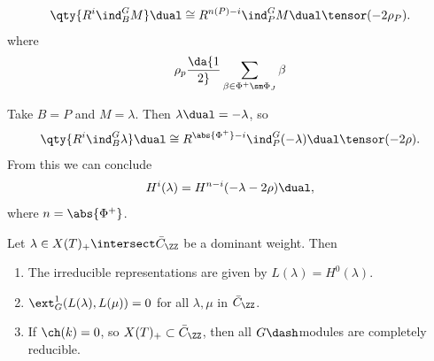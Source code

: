 \begin{theorem}

\begin{align*}  
\qty{ R^i \ind_B^G M }\dual \cong R^{n(P) -i} \ind_P^G M\dual \tensor (-2\rho_P)
.\end{align*} where
\begin{align*}
\rho_p \da {1\over 2}\sum_{\beta \in \Phi^+ \sm \Phi_J} \beta
\end{align*}

\end{theorem}

\begin{example}

Take \(B = P\) and \(M = \lambda\). Then \(\lambda \dual = -\lambda\),
so
\begin{align*}  
\qty{ R^i \ind_B^G \lambda }\dual \cong R^{\abs{\Phi^+} -i} \ind_P^G (- \lambda) \dual \tensor (-2\rho)
.\end{align*} From this we can conclude
\begin{align*}  
H^i(\lambda) = H^{n-i} (-\lambda - 2\rho)\dual
,\end{align*} where \(n = \abs{\Phi^+}\).

\end{example}

\begin{corollary}[?]

Let \(\lambda \in X(T)_+ \intersect \bar{C}_\ZZ\) be a dominant weight.
Then

\begin{enumerate}
\def\labelenumi{\alph{enumi}.}
\item
  The irreducible representations are given by
  \(L(\lambda) = H^0(\lambda)\).
\item
  \(\ext_G^1(L(\lambda), L(\mu)) = 0\) for all \(\lambda, \mu\) in
  \(\bar{C}_\ZZ\).
\item
  If \(\ch(k) = 0\), so \(X(T)_+ \subset \bar{C}_\ZZ\), then all
  \(G\dash\)modules are completely reducible.
\end{enumerate}

\end{corollary}

